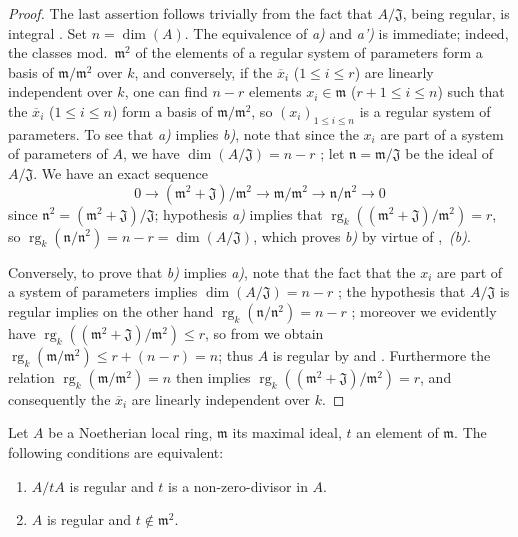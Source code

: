 \begin{proof}
The last assertion follows trivially from the fact that $A/\mathfrak{J}$, being regular, is integral .
Set $n=\dim(A)$.
The equivalence of \emph{a)} and \emph{a')} is immediate;
indeed, the classes mod.~$\mathfrak{m}^2$ of the elements of a regular system of parameters form a basis of $\mathfrak{m}/\mathfrak{m}^2$ over $k$, and conversely, if the $\overline{x}_i$ ($1\leq i\leq r$) are linearly independent over $k$, one can find $n-r$ elements $x_i\in\mathfrak{m}$ ($r+1\leq i\leq n$) such that the $\overline{x}_i$ ($1\leq i\leq n$) form a basis of $\mathfrak{m}/\mathfrak{m}^2$, so $(x_i)_{1\leq i\leq n}$ is a regular system of parameters.
To see that \emph{a)} implies \emph{b)}, note that since the $x_i$ are part of a system of parameters of $A$, we have $\dim(A/\mathfrak{J})=n-r$ ;
let $\mathfrak{n}=\mathfrak{m}/\mathfrak{J}$ be the ideal of $A/\mathfrak{J}$.
We have an exact sequence
\[
\label{0.17.1.7.1}
  0\to(\mathfrak{m}^2+\mathfrak{J})/\mathfrak{m}^2\to\mathfrak{m}/\mathfrak{m}^2\to\mathfrak{n}/\mathfrak{n}^2\to 0
  \tag{17.1.7.1}
\]
since $\mathfrak{n}^2=(\mathfrak{m}^2+\mathfrak{J})/\mathfrak{J}$;
hypothesis \emph{a)} implies that $\operatorname{rg}_k((\mathfrak{m}^2+\mathfrak{J})/\mathfrak{m}^2)=r$, so $\operatorname{rg}_k(\mathfrak{n}/\mathfrak{n}^2)=n-r=\dim(A/\mathfrak{J})$, which proves \emph{b)} by virtue of ,~\emph{(b)}.

Conversely, to prove that \emph{b)} implies \emph{a)}, note that the fact that the $x_i$ are part of a system of parameters implies $\dim(A/\mathfrak{J})=n-r$ ;
the hypothesis that $A/\mathfrak{J}$ is regular implies on the other hand $\operatorname{rg}_k(\mathfrak{n}/\mathfrak{n}^2)=n-r$ ;
moreover we evidently have $\operatorname{rg}_k((\mathfrak{m}^2+\mathfrak{J})/\mathfrak{m}^2)\leq r$, so from  we obtain $\operatorname{rg}_k(\mathfrak{m}/\mathfrak{m}^2)\leq r+(n-r)=n$;
thus $A$ is regular by  and .
Furthermore the relation $\operatorname{rg}_k(\mathfrak{m}/\mathfrak{m}^2)=n$ then implies $\operatorname{rg}_k((\mathfrak{m}^2+\mathfrak{J})/\mathfrak{m}^2)=r$, and consequently the $\overline{x}_i$ are linearly independent over $k$.
\end{proof}

\begin{corollary}[17.1.8]
\label{0.17.1.8}
Let $A$ be a Noetherian local ring, $\mathfrak{m}$ its maximal ideal, $t$ an element of $\mathfrak{m}$.
The following conditions are equivalent:
\begin{enumerate}
  \item[{\rm a)}] $A/tA$ is regular and $t$ is a non-zero-divisor in $A$.
  \item[{\rm b)}] $A$ is regular and $t\notin\mathfrak{m}^2$.
\end{enumerate}
\end{corollary}

